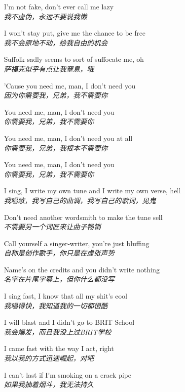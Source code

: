 \begin{spacing}{1.5}
\begin{flushleft}
I'm not fake, don't ever call me lazy\\
\textit{我不虚伪，永远不要说我懒}\lyricspace

I won't stay put, give me the chance to be free\\
\textit{我不会原地不动，给我自由的机会}\lyricspace

Suffolk sadly seems to sort of suffocate me, oh\\
\textit{萨福克似乎有点让我窒息，哦}\lyricspace

'Cause you need me, man, I don't need you\\
\textit{因为你需要我，兄弟，我不需要你}\lyricspace

You need me, man, I don't need you\\
\textit{你需要我，兄弟，我不需要你}\lyricspace

You need me, man, I don't need you at all\\
\textit{你需要我，兄弟，我根本不需要你}\lyricspace

You need me, man, I don't need you\\
\textit{你需要我，兄弟，我不需要你}\lyricspace

I sing, I write my own tune and I write my own verse, hell\\
\textit{我唱歌，我写自己的曲调，我写自己的歌词，见鬼}\lyricspace

Don't need another wordsmith to make the tune sell\\
\textit{不需要另一个词匠来让曲子畅销}\lyricspace

Call yourself a singer-writer, you're just bluffing\\
\textit{自称是创作歌手，你只是在虚张声势}\lyricspace

Name's on the credits and you didn't write nothing\\
\textit{名字在片尾字幕上，但你什么都没写}\lyricspace

I sing fast, I know that all my shit's cool\\
\textit{我唱得快，我知道我的一切都很酷}\lyricspace

I will blast and I didn't go to BRIT School\\
\textit{我会爆发，而且我没上过BRIT学校}\lyricspace

I came fast with the way I act, right\\
\textit{我以我的方式迅速崛起，对吧}\lyricspace

I can't last if I'm smoking on a crack pipe\\
\textit{如果我抽着烟斗，我无法持久}\lyricspace


\end{flushleft}
\end{spacing}
